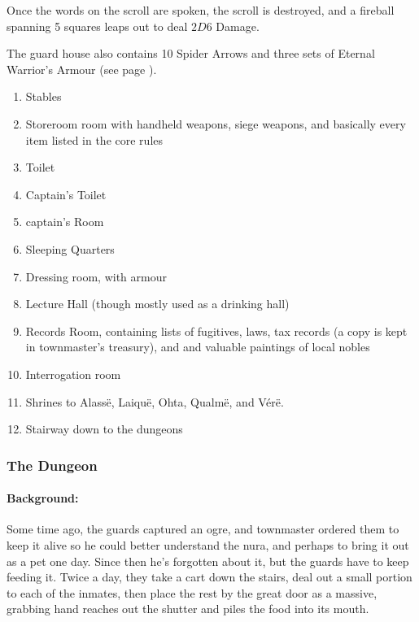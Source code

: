 \begin{multicols}{2}


Once the words on the scroll are spoken, the scroll is destroyed, and a fireball spanning 5 squares leaps out to deal $2D6$ Damage.

The guard house also contains 10 Spider Arrows and three sets of Eternal Warrior's Armour (see page \pageref{eternalwarriorarmour}).

\begin{enumerate}

  \item{Stables}
  \item{Storeroom room with handheld weapons, siege weapons, and basically every item listed in the core rules}
  \item{Toilet}
  \item{Captain's Toilet}
  \item{\gls{captain}'s Room}
  \item{Sleeping Quarters}
  \item{Dressing room, with armour}
  \item{Lecture Hall (though mostly used as a drinking hall)}
  \item{Records Room, containing lists of fugitives, laws, tax records (a copy is kept in \gls{townmaster}'s treasury), and and valuable paintings of local nobles}
  \item{Interrogation room}
  \item{Shrines to Alass\"{e}, Laiqu\"{e}, Ohta, Qualm\"{e}, and V\'{e}r\"{e}.}
  \item{Stairway down to the dungeons}
\end{enumerate}

\subsubsection{The Dungeon}

\paragraph{Background:}
Some time ago, the guards captured an ogre, and \gls{townmaster} ordered them to keep it alive so he could better understand the nura, and perhaps to bring it out as a pet one day.  Since then he's forgotten about it, but the guards have to keep feeding it.  Twice a day, they take a cart down the stairs, deal out a small portion to each of the inmates, then place the rest by the great door as a massive, grabbing hand reaches out the shutter and piles the food into its mouth.


\end{multicols}
